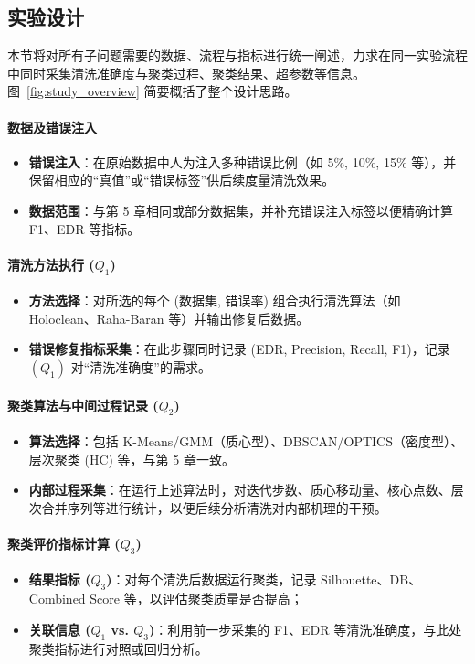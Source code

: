 \documentclass[10pt]{article} %
\numberwithin{equation}{section}
\begin{document}
\subsection{实验设计}
\label{sec:exp_design}

本节将对所有子问题需要的数据、流程与指标进行统一阐述，力求在同一实验流程中同时采集清洗准确度与聚类过程、聚类结果、超参数等信息。图~\ref{fig:study_overview} 简要概括了整个设计思路。

\paragraph{数据及错误注入}
\begin{itemize}
    \item \textbf{错误注入}：在原始数据中人为注入多种错误比例（如 5\%, 10\%, 15\% 等），并保留相应的“真值”或“错误标签”供后续度量清洗效果。
    \item \textbf{数据范围}：与第 5 章相同或部分数据集，并补充错误注入标签以便精确计算 F1、EDR 等指标。
\end{itemize}

\paragraph{清洗方法执行 (\(Q_1\))}
\begin{itemize}
    \item \textbf{方法选择}：对所选的每个 (数据集, 错误率) 组合执行清洗算法（如 Holoclean、Raha-Baran 等）并输出修复后数据。
    \item \textbf{错误修复指标采集}：在此步骤同时记录 (EDR, Precision, Recall, F1)，记录 \((Q_1)\) 对“清洗准确度”的需求。
\end{itemize}

\paragraph{聚类算法与中间过程记录 (\(Q_2\))}
\begin{itemize}
    \item \textbf{算法选择}：包括 K-Means/GMM（质心型）、DBSCAN/OPTICS（密度型）、层次聚类 (HC) 等，与第 5 章一致。
    \item \textbf{内部过程采集}：在运行上述算法时，对迭代步数、质心移动量、核心点数、层次合并序列等进行统计，以便后续分析清洗对内部机理的干预。
\end{itemize}

\paragraph{聚类评价指标计算 (\(Q_3\))}
\begin{itemize}
    \item \textbf{结果指标 (\(Q_3\))}：对每个清洗后数据运行聚类，记录 Silhouette、DB、Combined Score 等，以评估聚类质量是否提高；  
    \item \textbf{关联信息 (\(Q_1\) vs. \(Q_3\))}：利用前一步采集的 F1、EDR 等清洗准确度，与此处聚类指标进行对照或回归分析。
\end{itemize}
\end{document}
